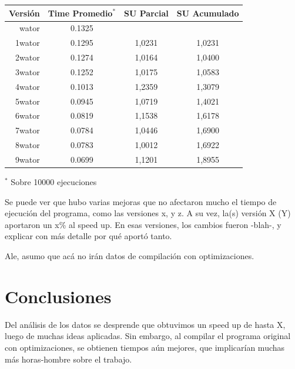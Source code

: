 \documentclass[a4paper,10pt]{article}
\begin{document}
\begin{center}
  \begin{tabular}{| r | c | c | c |}
    \hline
    Versi\'on	&   Time Promedio$^*$  &	SU Parcial	& 	SU Acumulado	\\ \hline \hline
    wator	&	0.1325		&       		&			\\ \hline
    1wator	&	0.1295		&   	1,0231		&	1,0231		\\ \hline
    2wator	&	0.1274		&	1,0164		&	1,0400		\\ \hline
    3wator	&	0.1252		&	1,0175		&	1,0583		\\ \hline
    4wator	&	0.1013		&	1,2359		&	1,3079		\\ \hline
    5wator	&	0.0945		&	1,0719		&	1,4021		\\ \hline
    6wator	&	0.0819		&	1,1538		&	1,6178		\\ \hline
    7wator	&	0.0784		&	1,0446		&	1,6900		\\ \hline
    8wator	&	0.0783		&	1,0012		&	1,6922		\\ \hline
    9wator	&	0.0699		&	1,1201		&	1,8955		\\ \hline

  \end{tabular}
\end{center}
	
	\small{$^*$ Sobre 10000 ejecuciones}
	
\bigskip

    Se puede ver que hubo varias mejoras que no afectaron mucho el tiempo de ejecuci\'on del programa, como las versiones x, y z. A su vez, la(s) versi\'on X (Y) aportaron un x\% al speed up. En esas versiones, los cambios fueron -blah-, y explicar con m\'as detalle por qu\'e aport\'o tanto.

    
    
    
Ale, asumo que ac\'a no ir\'an datos de compilaci\'on con optimizaciones.


\section{Conclusiones}

    Del an\'alisis de los datos se desprende que obtuvimos un speed up de hasta X, luego de muchas ideas aplicadas. Sin embargo, al compilar el programa original con optimizaciones, se obtienen tiempos aún mejores, que implicar\'ian muchas más horas-hombre sobre el trabajo.

\end{document}
